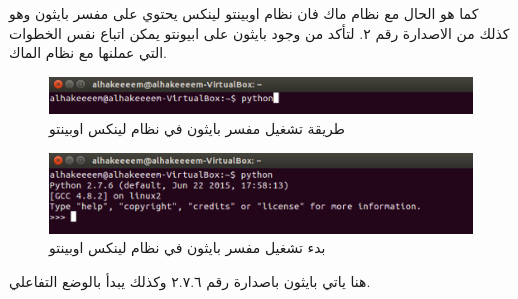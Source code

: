 كما هو الحال مع نظام ماك فان نظام اوبينتو لينكس يحتوي على مفسر بايثون وهو كذلك من الاصدارة رقم ٢. لتأكد من وجود بايثون على ابيونتو يمكن اتباع نفس الخطوات التي عملنها مع نظام الماك.

\begin{figure}[H]
  \includegraphics[width=\linewidth]{figures/ubintupython.png}
  \caption{طريقة تشغيل مفسر بايثون في نظام لينكس اوبينتو}
  \label{fig:startpython2}
\end{figure}

\begin{figure}[H]
  \includegraphics[width=\linewidth]{figures/ubintupython2.png}
  \caption{بدء تشغيل مفسر بايثون في نظام لينكس اوبينتو}
  \label{fig:startpython2}
\end{figure}
هنا ياتي بايثون باصدارة رقم ٢.٧.٦ وكذلك يبدأ بالوضع التفاعلي.		

